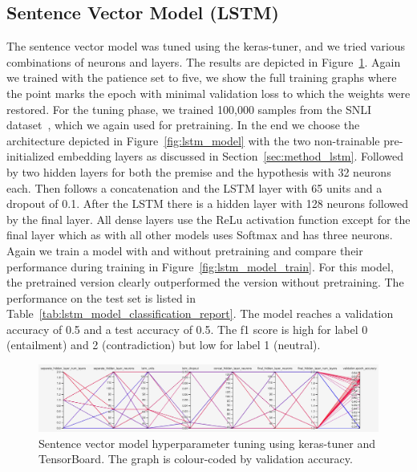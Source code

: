 \documentclass[acmsmall,nonacm]{acmart}
\begin{document}
\subsection{Sentence Vector Model (LSTM)}
The sentence vector model was tuned using the keras-tuner, and we tried various combinations of neurons and layers. The results are depicted in Figure~\ref{fig:lstm_hyperparameter_tuning}. Again we trained with the patience set to five, we show the full training graphs where the point marks the epoch with minimal validation loss to which the weights were restored. For the tuning phase, we trained 100,000 samples from the SNLI dataset~\cite{snli-bowman2015}, which we again used for pretraining. 
In the end we choose the architecture depicted in Figure~\ref{fig:lstm_model} with the two non-trainable pre-initialized embedding layers as discussed in Section~\ref{sec:method_lstm}. Followed by two hidden layers for both the premise and the hypothesis with 32 neurons each. Then follows a concatenation and the LSTM layer with 65 units and a dropout of 0.1. After the LSTM there is a hidden layer with 128 neurons followed by the final layer. All dense layers use the ReLu activation function except for the final layer which as with all other models uses Softmax and has three neurons. Again we train a model with and without pretraining and compare their performance during training in Figure~\ref{fig:lstm_model_train}. For this model, the pretrained version clearly outperformed the version without pretraining. The performance on the test set is listed in Table~\ref{tab:lstm_model_classification_report}. The model reaches a validation accuracy of 0.5 and a test accuracy of 0.5. The f1 score is high for label 0 (entailment) and 2 (contradiction) but low for label 1 (neutral). 

\begin{figure}[h!]
  \includegraphics[width=1\textwidth]{assets/lstm_hyper_parameter_tuning.jpg}
  \caption{Sentence vector model hyperparameter tuning using keras-tuner and TensorBoard. The graph is colour-coded by validation accuracy.}
  \label{fig:lstm_hyperparameter_tuning}
\end{figure}
\end{document}
